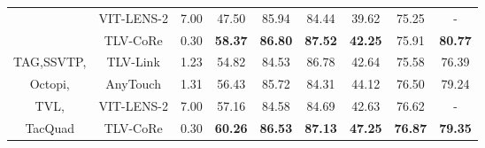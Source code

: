 \documentclass[letterpaper]{article} %
\theoremstyle{definition}                %
\theoremstyle{plain}                     %
\theoremstyle{remark}                    %
\begin{document}
\begin{table}[ht!]
\begin{tabular}{@{}c|c|c|ccc|c|c|
c@{}}
                                                  & VIT-LENS-2   &    7.00       &     {\cellcolor[HTML]{E8F1F9}47.50}     &    {\cellcolor[HTML]{E8F1F9}85.94}          &     {\cellcolor[HTML]{E8F1F9}84.44}     &      {\cellcolor[HTML]{E8F1F9}39.62}                             &     {\cellcolor[HTML]{E8F1F9}75.25} & \multicolumn{1}{c}{{\cellcolor[HTML]{E8F1F9}-}}                              \\
                                                  & TLV-CoRe    &    0.30        &    {\cellcolor[HTML]{E8F1F9}\textbf{58.37}}      &   {\cellcolor[HTML]{E8F1F9}\textbf{86.80}}           &    {\cellcolor[HTML]{E8F1F9}\textbf{87.52}}     &    {\cellcolor[HTML]{E8F1F9}\textbf{42.25}}                                &   {\cellcolor[HTML]{E8F1F9}75.91}   & \multicolumn{1}{c}{{\cellcolor[HTML]{E8F1F9}\textbf{80.77}}}                             \\ \midrule
TAG,SSVTP, & TLV-Link      &    1.23      &    {\cellcolor[HTML]{E8F1F9}54.82}      &    {\cellcolor[HTML]{E8F1F9}84.53}          &    {\cellcolor[HTML]{E8F1F9}86.78}      &              {\cellcolor[HTML]{E8F1F9}42.64}                     &        {\cellcolor[HTML]{E8F1F9}75.58}      & \multicolumn{1}{c}{{\cellcolor[HTML]{E8F1F9}76.39}}                     \\
                                        Octopi,          & AnyTouch      &  1.31        &   {\cellcolor[HTML]{E8F1F9}56.43}       &     {\cellcolor[HTML]{E8F1F9}85.72}         &  {\cellcolor[HTML]{E8F1F9}84.31}        &     {\cellcolor[HTML]{E8F1F9}44.12}                              &        {\cellcolor[HTML]{E8F1F9}76.50} & \multicolumn{1}{c}{{\cellcolor[HTML]{E8F1F9}79.24}}                           \\
                                            TVL,      & VIT-LENS-2       & 7.00      &   {\cellcolor[HTML]{E8F1F9}57.16}       &      {\cellcolor[HTML]{E8F1F9}84.58}        &    {\cellcolor[HTML]{E8F1F9}84.69}      &       {\cellcolor[HTML]{E8F1F9}42.63}                            &    {\cellcolor[HTML]{E8F1F9}76.62} & \multicolumn{1}{c}{{\cellcolor[HTML]{E8F1F9}-}}                               \\
                                            TacQuad   & TLV-CoRe    &    0.30        &    {\cellcolor[HTML]{E8F1F9}\textbf{60.26}}      &   {\cellcolor[HTML]{E8F1F9}\textbf{86.53}}           &     {\cellcolor[HTML]{E8F1F9}\textbf{87.13}}     &     {\cellcolor[HTML]{E8F1F9}\textbf{47.25}}                              &    {\cellcolor[HTML]{E8F1F9}\textbf{76.87}} & \multicolumn{1}{c}{{\cellcolor[HTML]{E8F1F9}\textbf{79.35}}}                               \\ \bottomrule[1.2pt]

\end{tabular}
\end{table}
\end{document}
